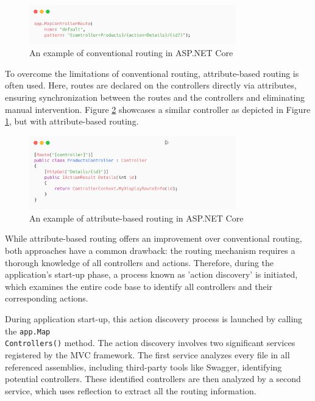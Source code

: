 \begin{figure}[H]
\centering
\includegraphics[width=0.8\textwidth]{graphics/conventional-routing.png}
\caption{An example of conventional routing in ASP.NET Core}
\label{fig:conventional-routing}
\end{figure}

To overcome the limitations of conventional routing, attribute-based routing is often used. Here, routes are declared on the controllers directly via attributes, ensuring synchronization between the routes and the controllers and eliminating manual intervention. Figure \ref{fig:attribute-routing} showcases a similar controller as depicted in Figure \ref{fig:conventional-routing}, but with attribute-based routing.

\begin{figure}[H]
\centering
\includegraphics[width=0.8\textwidth]{graphics/attribute-routing.png}
\caption{An example of attribute-based routing in ASP.NET Core}
\label{fig:attribute-routing}
\end{figure}

While attribute-based routing offers an improvement over conventional routing, both approaches have a common drawback: the routing mechanism requires a thorough knowledge of all controllers and actions. Therefore, during the application's start-up phase, a process known as 'action discovery' is initiated, which examines the entire code base to identify all controllers and their corresponding actions.

During application start-up, this action discovery process is launched by calling the \texttt{app.Map\\Controllers()} method. The action discovery involves two significant services registered by the MVC framework. The first service analyzes every file in all referenced assemblies, including third-party tools like Swagger, identifying potential controllers. These identified controllers are then analyzed by a second service, which uses reflection to extract all the routing information.

